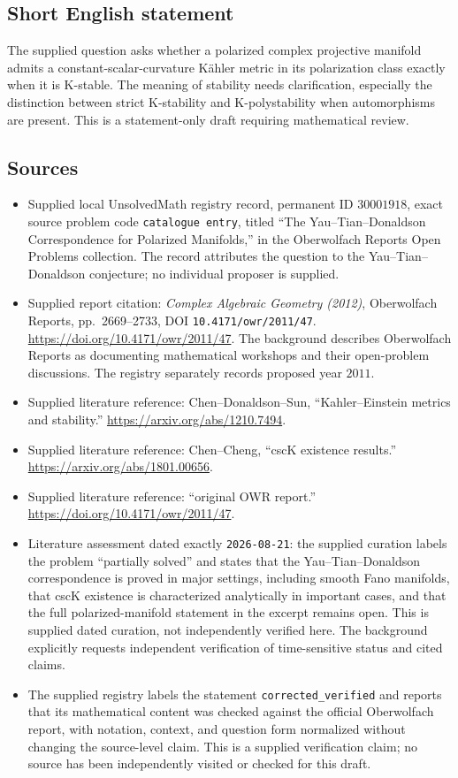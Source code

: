 \documentclass[11pt]{article}
\begin{document}
\subsection{Short English statement}
The supplied question asks whether a polarized complex projective manifold admits a constant-scalar-curvature K\"ahler metric in its polarization class exactly when it is K-stable. The meaning of stability needs clarification, especially the distinction between strict K-stability and K-polystability when automorphisms are present. This is a statement-only draft requiring mathematical review.
\subsection{Sources}
\begin{itemize}
\item Supplied local UnsolvedMath registry record, permanent ID \(30001918\), exact source problem code \texttt{catalogue entry}, titled ``The Yau--Tian--Donaldson Correspondence for Polarized Manifolds,'' in the Oberwolfach Reports Open Problems collection. The record attributes the question to the Yau--Tian--Donaldson conjecture; no individual proposer is supplied.
\item Supplied report citation: \emph{Complex Algebraic Geometry (2012)}, Oberwolfach Reports, pp.\ 2669--2733, DOI \texttt{10.4171/owr/2011/47}. \url{https://doi.org/10.4171/owr/2011/47}. The background describes Oberwolfach Reports as documenting mathematical workshops and their open-problem discussions. The registry separately records proposed year \(2011\).
\item Supplied literature reference: Chen--Donaldson--Sun, ``Kahler--Einstein metrics and stability.'' \url{https://arxiv.org/abs/1210.7494}.
\item Supplied literature reference: Chen--Cheng, ``cscK existence results.'' \url{https://arxiv.org/abs/1801.00656}.
\item Supplied literature reference: ``original OWR report.'' \url{https://doi.org/10.4171/owr/2011/47}.
\item Literature assessment dated exactly \texttt{2026-08-21}: the supplied curation labels the problem ``partially solved'' and states that the Yau--Tian--Donaldson correspondence is proved in major settings, including smooth Fano manifolds, that cscK existence is characterized analytically in important cases, and that the full polarized-manifold statement in the excerpt remains open. This is supplied dated curation, not independently verified here. The background explicitly requests independent verification of time-sensitive status and cited claims.
\item The supplied registry labels the statement \texttt{corrected\_verified} and reports that its mathematical content was checked against the official Oberwolfach report, with notation, context, and question form normalized without changing the source-level claim. This is a supplied verification claim; no source has been independently visited or checked for this draft.
\end{itemize}
\end{document}
